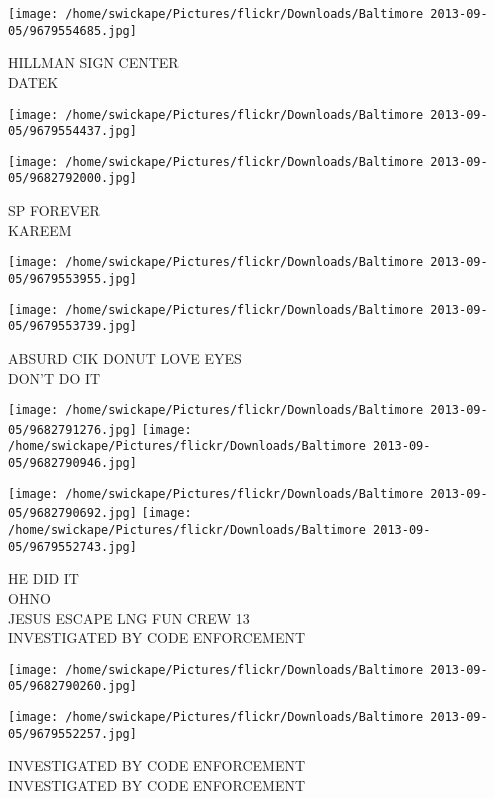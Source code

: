 \documentclass[10pt,letterpaper]{article}
\begin{document}
\vspace{0.25in}
\texttt{[image: /home/swickape/Pictures/flickr/Downloads/Baltimore 2013-09-05/9679554685.jpg]}

HILLMAN SIGN CENTER\\
DATEK
\pagebreak

\texttt{[image: /home/swickape/Pictures/flickr/Downloads/Baltimore 2013-09-05/9679554437.jpg]}

\vspace{0.25in}
\texttt{[image: /home/swickape/Pictures/flickr/Downloads/Baltimore 2013-09-05/9682792000.jpg]}

SP FOREVER\\
KAREEM
\pagebreak

\texttt{[image: /home/swickape/Pictures/flickr/Downloads/Baltimore 2013-09-05/9679553955.jpg]}

\vspace{0.25in}
\texttt{[image: /home/swickape/Pictures/flickr/Downloads/Baltimore 2013-09-05/9679553739.jpg]}

ABSURD CIK DONUT LOVE EYES\\
DON'T DO IT
\pagebreak

\texttt{[image: /home/swickape/Pictures/flickr/Downloads/Baltimore 2013-09-05/9682791276.jpg]}
\texttt{[image: /home/swickape/Pictures/flickr/Downloads/Baltimore 2013-09-05/9682790946.jpg]}

\texttt{[image: /home/swickape/Pictures/flickr/Downloads/Baltimore 2013-09-05/9682790692.jpg]}
\texttt{[image: /home/swickape/Pictures/flickr/Downloads/Baltimore 2013-09-05/9679552743.jpg]}

HE DID IT\\
OHNO\\
JESUS ESCAPE LNG FUN CREW 13\\
INVESTIGATED BY CODE ENFORCEMENT
\pagebreak

\texttt{[image: /home/swickape/Pictures/flickr/Downloads/Baltimore 2013-09-05/9682790260.jpg]}

\vspace{0.25in}
\texttt{[image: /home/swickape/Pictures/flickr/Downloads/Baltimore 2013-09-05/9679552257.jpg]}

INVESTIGATED BY CODE ENFORCEMENT\\
INVESTIGATED BY CODE ENFORCEMENT
\pagebreak
\end{document}
